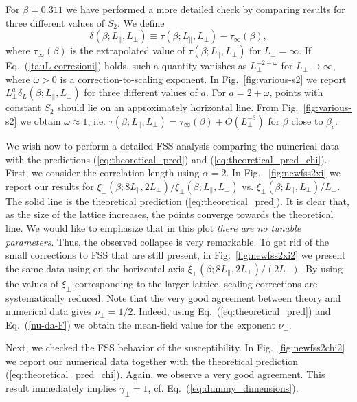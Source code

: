 \documentclass[12pt]{article}
\begin{document}
For $\beta = 0.311$ we have performed a more detailed check by comparing 
results for three different values of $S_2$. We define
\begin{equation}
\delta(\beta;L_\|,L_\bot) \equiv \tau(\beta;L_\|,L_\bot) - \tau_\infty(\beta),
\end{equation}
where $\tau_\infty(\beta)$ is the extrapolated value of 
$\tau(\beta;L_\|,L_\bot)$ for $L_\bot=\infty$. 
If Eq.~(\ref{tauL-correzioni}) holds, 
such a quantity vanishes as $L_\bot^{-2-\omega}$ for $L_\bot\to\infty$, where 
$\omega>0$ is a correction-to-scaling exponent. 
In Fig.~\ref{fig:various-s2} we report $L_\bot^a \delta_L(\beta;L_\|,L_\bot)$ 
for three different values of $a$. For $a=2+\omega$, points with constant $S_2$
should lie on an approximately horizontal line. 
From Fig.~\ref{fig:various-s2} we obtain
$\omega \approx 1$, i.e. 
$\tau(\beta;L_\|,L_\bot) = \tau_\infty(\beta) + O(L_\bot^{-3})$ 
for $\beta$ close to $\beta_c$.

We wish now to perform a detailed FSS analysis comparing the numerical
data with the predictions (\ref{eq:theoretical_pred}) and 
(\ref{eq:theoretical_pred_chi}). First, we consider the correlation length 
using $\alpha = 2$. In Fig. ~\ref{fig:newfss2xi} 
we report our results for 
$\xi_\bot(\beta;8 L_\|,2 L_\bot)/\xi_\bot(\beta;L_\|,L_\bot)$ vs. 
$\xi_\bot(\beta;L_\|,L_\bot)/L_\bot$.
The solid line is the
theoretical prediction (\ref{eq:theoretical_pred}). 
It is clear that, as the size of the lattice
increases, the points converge towards the theoretical line. We would
like to emphasize that in this plot \emph{there are no tunable parameters}.
Thus, the observed collapse is very remarkable. To get rid of
the small corrections to FSS that are still present, in
Fig.~\ref{fig:newfss2xi2} we present the same data using on the 
horizontal axis $\xi_\bot(\beta;8 L_\|,2 L_\bot)/(2 L_\bot)$. 
By using the values of $\xi_\bot$ corresponding to the 
larger lattice, scaling corrections are systematically reduced.
Note that the very good agreement between theory and numerical data 
gives $\nu_\bot = 1/2$. Indeed, using 
Eq.~(\ref{eq:theoretical_pred}) and Eq.~(\ref{nu-da-F}) 
we obtain the mean-field value for the exponent $\nu_\bot$.

Next, we checked the FSS behavior of  the susceptibility.
In Fig.~\ref{fig:newfss2chi2} we report our numerical data together with 
the theoretical prediction (\ref{eq:theoretical_pred_chi}).
Again, we observe a very good agreement. This result immediately
implies $\gamma_\bot = 1$, cf. Eq.~(\ref{eq:dummy_dimensions}).
\end{document}
